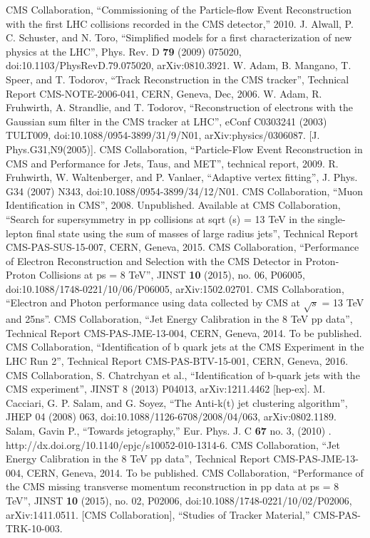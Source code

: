 \begin{thebibliography}{9}
CMS Collaboration, “Commissioning of the Particle-flow Event Reconstruction with the first LHC collisions recorded in the CMS detector,” 2010.
J. Alwall, P. C. Schuster, and N. Toro, “Simplified models for a first characterization of new physics at the LHC”, Phys. Rev. D \textbf{79} (2009) 075020, doi:10.1103/PhysRevD.79.075020, arXiv:0810.3921.
W. Adam, B. Mangano, T. Speer, and T. Todorov, “Track Reconstruction in the CMS tracker”, Technical Report CMS-NOTE-2006-041, CERN, Geneva, Dec, 2006.
W. Adam, R. Fruhwirth, A. Strandlie, and T. Todorov, “Reconstruction of electrons with the Gaussian sum filter in the CMS tracker at LHC”, eConf C0303241 (2003) TULT009, doi:10.1088/0954-3899/31/9/N01, arXiv:physics/0306087. [J. Phys.G31,N9(2005)].
CMS Collaboration, “Particle-Flow Event Reconstruction in CMS and Performance for Jets, Taus, and MET”, technical report, 2009.
R. Fruhwirth, W. Waltenberger, and P. Vanlaer, “Adaptive vertex fitting”, J. Phys. G34 (2007) N343, doi:10.1088/0954-3899/34/12/N01.
CMS Collaboration, “Muon Identification in CMS”, 2008. Unpublished. Available at %
CMS Collaboration, “Search for supersymmetry in pp collisions at sqrt (s) = 13 TeV in the single-lepton final state using the sum of masses of large radius jets”, Technical Report CMS-PAS-SUS-15-007, CERN, Geneva, 2015.
CMS Collaboration, “Performance of Electron Reconstruction and Selection with the CMS Detector in Proton-Proton Collisions at ps = 8 TeV”, JINST \textbf{10} (2015), no. 06, P06005, doi:10.1088/1748-0221/10/06/P06005, arXiv:1502.02701.
CMS Collaboration, “Electron and Photon performance using data collected by CMS at $\sqrt{s}$ = 13 TeV and 25ns”.
CMS Collaboration, “Jet Energy Calibration in the 8 TeV pp data”, Technical Report CMS-PAS-JME-13-004, CERN, Geneva, 2014. To be published.
CMS Collaboration, “Identification of b quark jets at the CMS Experiment in the LHC Run 2”, Technical Report CMS-PAS-BTV-15-001, CERN, Geneva, 2016.
CMS Collaboration, S. Chatrchyan et al., “Identification of b-quark jets with the CMS experiment”, JINST 8 (2013) P04013, arXiv:1211.4462 [hep-ex].
M. Cacciari, G. P. Salam, and G. Soyez, “The Anti-k(t) jet clustering algorithm”, JHEP 04 (2008) 063, doi:10.1088/1126-6708/2008/04/063, arXiv:0802.1189.
Salam, Gavin P., “Towards jetography,” Eur. Phys. J. C \textbf{67} no. 3, (2010) . http://dx.doi.org/10.1140/epjc/s10052-010-1314-6.
CMS Collaboration, “Jet Energy Calibration in the 8 TeV pp data”, Technical Report CMS-PAS-JME-13-004, CERN, Geneva, 2014. To be published.
CMS Collaboration, “Performance of the CMS missing transverse momentum reconstruction in pp data at ps = 8 TeV”, JINST \textbf{10} (2015), no. 02, P02006, doi:10.1088/1748-0221/10/02/P02006, arXiv:1411.0511.
  [CMS Collaboration],
  ``Studies of Tracker Material,''
  CMS-PAS-TRK-10-003.
\end{thebibliography}
